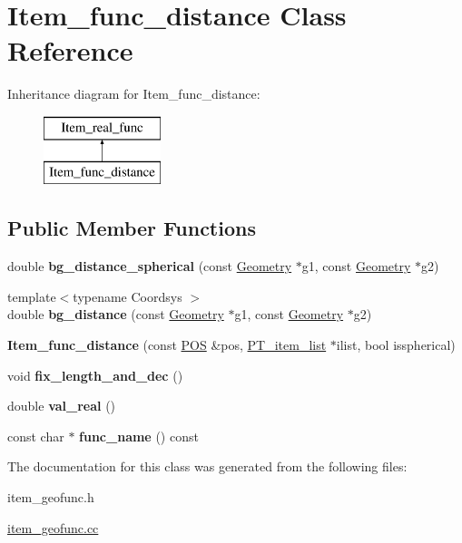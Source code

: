 \hypertarget{classItem__func__distance}{}\section{Item\+\_\+func\+\_\+distance Class Reference}
\label{classItem__func__distance}
Inheritance diagram for Item\+\_\+func\+\_\+distance\+:\begin{figure}[H]
\begin{center}
\leavevmode
\includegraphics[height=2.000000cm]{classItem__func__distance}
\end{center}
\end{figure}
\subsection*{Public Member Functions}
\begin{DoxyCompactItemize}
\item 
\mbox{\label{classItem__func__distance_a71b94e492df4c9c85a59852aaddb1950}} 
double {\bfseries bg\+\_\+distance\+\_\+spherical} (const \mbox{\hyperlink{classGeometry}{Geometry}} $\ast$g1, const \mbox{\hyperlink{classGeometry}{Geometry}} $\ast$g2)
\item 
\mbox{\label{classItem__func__distance_a5b19f398bf8c21dd3933597bf606065d}} 
{\footnotesize template$<$typename Coordsys $>$ }\\double {\bfseries bg\+\_\+distance} (const \mbox{\hyperlink{classGeometry}{Geometry}} $\ast$g1, const \mbox{\hyperlink{classGeometry}{Geometry}} $\ast$g2)
\item 
\mbox{\label{classItem__func__distance_a22a8dfdfa4a456b1cdd232daf4d9ae57}} 
{\bfseries Item\+\_\+func\+\_\+distance} (const \mbox{\hyperlink{structYYLTYPE}{P\+OS}} \&pos, \mbox{\hyperlink{classPT__item__list}{P\+T\+\_\+item\+\_\+list}} $\ast$ilist, bool isspherical)
\item 
\mbox{\label{classItem__func__distance_ad50b1bfc95b648fa4895331a95529cae}} 
void {\bfseries fix\+\_\+length\+\_\+and\+\_\+dec} ()
\item 
\mbox{\label{classItem__func__distance_aa597863fef92f5859725da6ca2f18931}} 
double {\bfseries val\+\_\+real} ()
\item 
\mbox{\label{classItem__func__distance_a157249d992509cc170393ff06bf3ad36}} 
const char $\ast$ {\bfseries func\+\_\+name} () const
\end{DoxyCompactItemize}


The documentation for this class was generated from the following files\+:\begin{DoxyCompactItemize}
\item 
item\+\_\+geofunc.\+h\item 
\mbox{\hyperlink{item__geofunc_8cc}{item\+\_\+geofunc.\+cc}}\end{DoxyCompactItemize}

